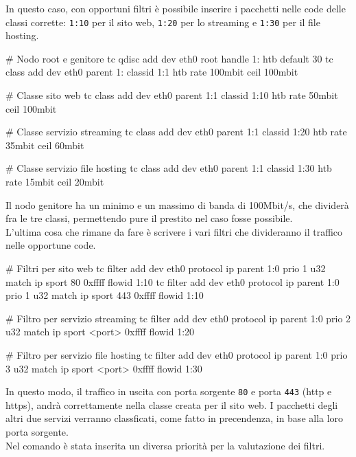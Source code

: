 In questo caso, con opportuni filtri è possibile inserire i pacchetti nelle code delle classi corrette: \texttt{1:10} per il sito web, \texttt{1:20} per lo streaming e \texttt{1:30} per il file hosting.
\begin{bash}
  # Nodo root e genitore
  tc qdisc add dev eth0 root handle 1: htb default 30
  tc class add dev eth0 parent 1: classid 1:1 htb rate 100mbit ceil 100mbit

  # Classe sito web
  tc class add dev eth0 parent 1:1 classid 1:10 htb rate 50mbit ceil 100mbit

  # Classe servizio streaming
  tc class add dev eth0 parent 1:1 classid 1:20 htb rate 35mbit ceil 60mbit

  # Classe servizio file hosting
  tc class add dev eth0 parent 1:1 classid 1:30 htb rate 15mbit ceil 20mbit
\end{bash}
Il nodo genitore ha un minimo e un massimo di banda di 100Mbit/s, che dividerà fra le tre classi, permettendo pure il prestito nel caso fosse possibile. \\
L'ultima cosa che rimane da fare è scrivere i vari filtri che divideranno il traffico nelle opportune code.

\begin{bash}
  # Filtri per sito web
  tc filter add dev eth0 protocol ip parent 1:0 prio 1 u32 match ip sport 80 0xffff flowid 1:10
  tc filter add dev eth0 protocol ip parent 1:0 prio 1 u32 match ip sport 443 0xffff flowid 1:10

  # Filtro per servizio streaming 
  tc filter add dev eth0 protocol ip parent 1:0 prio 2 u32 match ip sport <port> 0xffff flowid 1:20

  # Filtro per servizio file hosting
  tc filter add dev eth0 protocol ip parent 1:0 prio 3 u32 match ip sport <port> 0xffff flowid 1:30
\end{bash}
In questo modo, il traffico in uscita con porta sorgente \texttt{80} e porta \texttt{443} (http e https), andrà correttamente nella classe creata per il sito web. 
I pacchetti degli altri due servizi verranno classficati, come fatto in precendenza, in base alla loro porta sorgente. \\ 
Nel comando è stata inserita un diversa priorità per la valutazione dei filtri.

